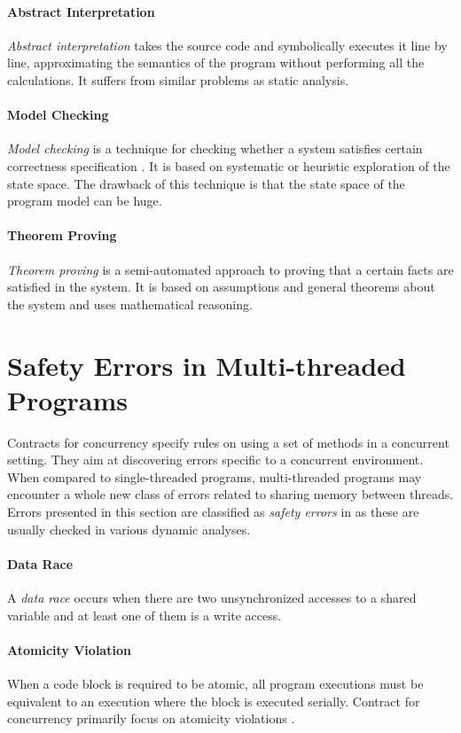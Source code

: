 \paragraph{Abstract Interpretation}
\emph{Abstract interpretation} takes the source code and symbolically executes
it line by line, approximating the semantics of the program without performing
all the calculations. It suffers from similar problems as static analysis.

\paragraph{Model Checking}
\emph{Model checking} is a technique for checking whether a system satisfies
certain correctness specification \cite{letko}. It is based on systematic or
heuristic exploration of the state space. The drawback of this technique is that
the state space of the program model can be huge.

\paragraph{Theorem Proving}
\emph{Theorem proving} is a semi-automated approach to proving that a certain
facts are satisfied in the system. It is based on assumptions and general
theorems about the system and uses mathematical reasoning.


\section{Safety Errors in Multi-threaded Programs}

Contracts for concurrency specify rules on using a set of methods in a
concurrent setting. They aim at discovering errors specific to a concurrent
environment. When compared to single-threaded programs, multi-threaded programs
may encounter a whole new class of errors related to sharing memory between
threads. Errors presented in this section are classified as \emph{safety errors}
in \cite{letko} as these are usually checked in various dynamic analyses.

\paragraph{Data Race}
A \emph{data race} occurs when there are two unsynchronized accesses to a shared
variable and at least one of them is a write access.

\paragraph{Atomicity Violation}
When a code block is required to be atomic, all program executions must be
equivalent to an execution where the block is executed serially. Contract for
concurrency primarily focus on atomicity violations \cite{contracts}.


